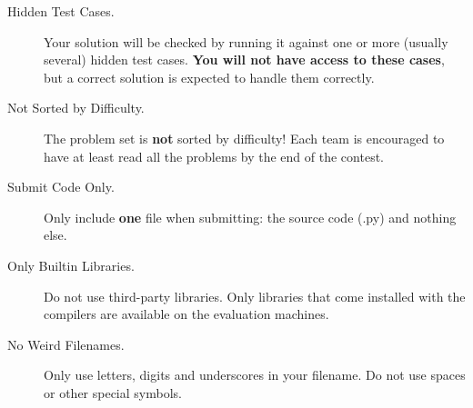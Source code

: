 \begin{description}


\item[Hidden Test Cases.]
Your solution will be checked by running it against one or more (usually several) hidden test cases. \textbf{You will not have access to these cases}, but a correct solution is expected to handle them correctly. \\

\item[Not Sorted by Difficulty.] The problem set is \textbf{not} sorted by difficulty!  Each team is encouraged to have at least read all the problems by the end of the contest. \\

\item[Submit Code Only.]
Only include \textbf{one} file when submitting: the source code (.py) and nothing else. \\

\item[Only Builtin Libraries.]
Do not use third-party libraries. Only libraries that come installed with the compilers are available on the evaluation machines. \\

\item[No Weird Filenames.]
Only use letters, digits and underscores in your filename. Do not use spaces or other special symbols. \\

\prefacenotesIO{}




\end{description}

